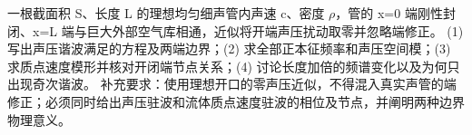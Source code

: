 一根截面积 S、长度 L 的理想均匀细声管内声速 c、密度 \(\rho\)，管的 x=0 端刚性封闭、x=L 端与巨大外部空气库相通，近似将开端声压扰动取零并忽略端修正。
(1) 写出声压谐波满足的方程及两端边界；(2) 求全部正本征频率和声压空间模；(3) 求质点速度模形并核对开闭端节点关系；(4) 讨论长度加倍的频谱变化以及为何只出现奇次谐波。
补充要求：使用理想开口的零声压近似，不得混入真实声管的端修正；必须同时给出声压驻波和流体质点速度驻波的相位及节点，并阐明两种边界物理意义。
